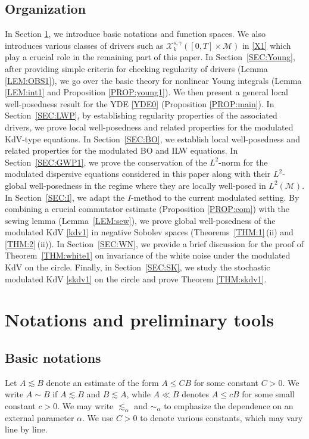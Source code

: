 \documentclass[letterpaper, 11pt,  reqno]{amsart}
\newcommand{\1}{\hspace{0.5mm}\text{I}\hspace{0.5mm}}
\newcommand{\al}{\alpha}
\newcommand{\g}{\gamma}
\newcommand{\les}{\lesssim}
\newcommand{\M}{\mathcal{M}}
\newcommand{\cX}{\mathcal{X}}
\numberwithin{equation}{section}
\numberwithin{theorem}{section}
\begin{document}
\subsection{Organization}

In Section
\ref{SEC:2}, 
we introduce basic notations and function spaces.
We also introduces various classes of drivers
such as $\cX^{s, \g}_k ([0, T]\times \M)$ in \eqref{X1}
which play a crucial role in the remaining part of this paper.
In Section~\ref{SEC:Young}, 
after providing simple criteria
for checking regularity of drivers (Lemma \ref{LEM:OBS1}), 
we go over the basic theory
for nonlinear Young integrals
(Lemma \ref{LEM:int1} and Proposition \ref{PROP:young1}).
We then present a general local well-posedness
result for the YDE \eqref{YDE0}
(Proposition \ref{PROP:main}).
In Section~\ref{SEC:LWP}, 
by establishing regularity properties
of the associated drivers, 
we prove local well-posedness and related properties
for the modulated KdV-type equations.
In Section~\ref{SEC:BO}, 
we establish local well-posedness and related properties
for the modulated BO and ILW  equations.
In Section~\ref{SEC:GWP1}, 
we prove the conservation of the $L^2$-norm
for the modulated dispersive equations considered in this paper
along with their $L^2$-global well-posedness
in the regime where they are locally well-posed in $L^2(\M)$.
In Section~\ref{SEC:I}, we adapt the $I$-method
to the current modulated setting.
By combining a crucial  commutator estimate
(Proposition \ref{PROP:com})
with the sewing lemma (Lemma~\ref{LEM:sew}), 
we prove global well-posedness of the modulated
KdV \eqref{kdv1} in negative Sobolev spaces
(Theorems~\ref{THM:1}\,(ii) and \ref{THM:2}\,(ii)).
In Section~\ref{SEC:WN}, we provide a brief discussion 
for
the proof of Theorem~\ref{THM:white1}
on invariance of the white noise under the modulated KdV on the circle.
Finally, 
in Section~\ref{SEC:SK}, 
we study the stochastic modulated KdV
\eqref{skdv1} on the circle and prove Theorem \ref{THM:skdv1}.





\section{Notations and preliminary tools}
\label{SEC:2}

\subsection{Basic notations}
Let $A\les B$ denote an estimate of the form $A\leq CB$ for some constant $C>0$. We write $A\sim B$ if $A\les B$ and $B\les A$, while $A\ll B$ denotes $A\leq c B$ for some small constant $c> 0$. 
We may write  $\les_{\al}$ and $\sim_{\al}$ to 
emphasize the dependence on an external parameter $\al$.
We use $C>0$ to denote various constants, which may vary line by line.
\end{document}
